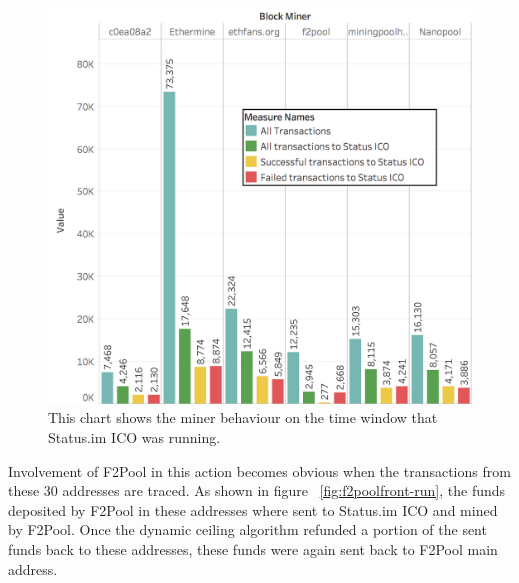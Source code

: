 \begin{figure}[h]
\centering
\includegraphics[width=0.7\linewidth]{figures/Transactions_miners_while_status_ico_cut.png}
\caption{This chart shows the miner behaviour on the time window that Status.im ICO was running. \label{fig:Transactions_miners_while_status_ico_cut}} 
\end{figure}





Involvement of F2Pool in this action becomes obvious when the transactions from these 30 addresses are traced. As shown in figure ~\ref{fig:f2poolfront-run}, the funds deposited by F2Pool in these addresses where sent to Status.im ICO and mined by F2Pool. Once the dynamic ceiling algorithm refunded a portion of the sent funds back to these addresses, these funds were again sent back to F2Pool main address. 


